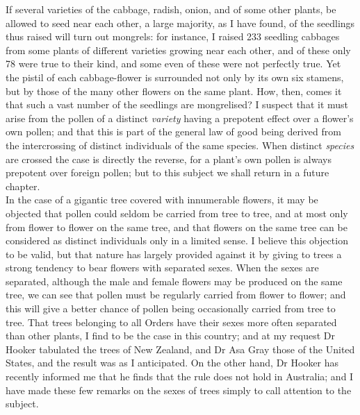 \indent If several varieties of the cabbage, radish, onion, and of some other plants, be allowed to seed near each other, a large majority, as I have found, of the seedlings thus raised will turn out mongrels: for instance, I raised 233 seedling cabbages from some plants of different varieties growing near each other, and of these only 78 were true to their kind, and some even of these were not perfectly true.  Yet the pistil of each cabbage-flower is surrounded not only by its own six stamens, but by those of the many other flowers on the same plant. How, then, comes it that such a vast number of the seedlings are mongrelised? I suspect that it must arise from the pollen of a distinct \emph{variety} having a prepotent effect over a flower's own pollen; and that this is part of the general law of good being derived from the intercrossing of distinct individuals of the same species. When distinct \emph{species} are crossed the case is directly the reverse, for a plant's own pollen is always prepotent over foreign pollen; but to this subject we shall return in a future chapter. \\
\indent In the case of a gigantic tree covered with innumerable flowers, it may be objected that pollen could seldom be carried from tree to tree, and at most only from flower to flower on the same tree, and that flowers on the same tree can be considered as distinct individuals only in a limited sense. I believe this objection to be valid, but that nature has largely provided against it by giving to trees a strong tendency to bear flowers with separated sexes. When the sexes are separated, although the male and female flowers may be produced on the same tree, we can see that pollen must be regularly carried from flower to flower; and this will give a better chance of pollen being occasionally carried from tree to tree. That trees belonging to all Orders have their sexes more often separated than other plants, I find to be the case in this country; and at my request Dr Hooker tabulated the trees of New Zealand, and Dr Asa Gray those of the United States, and the result was as I anticipated. On the other hand, Dr Hooker has recently informed me that he finds that the rule does not hold in Australia; and I have made these few remarks on the sexes of trees simply to call attention to the subject. \\
